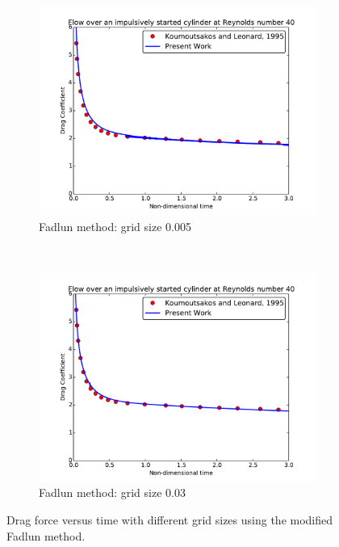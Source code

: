 \documentclass[onehalf,11pt]{beavtex}
\begin{document}
\begin{figure}[!htb]
	\centering
	\begin{subfigure}{0.4\textwidth}
		\includegraphics[width=\linewidth]{fadlun005}
		\caption{Fadlun method: grid size 0.005}
	\end{subfigure}
	~
	\begin{subfigure}{0.4\textwidth}
			\includegraphics[width=\linewidth]{fadlun03}
			\caption{Fadlun method: grid size 0.03}
	\end{subfigure}
	\caption{Drag force versus time with different grid sizes using the modified Fadlun method.}
	\label{fig:fadlun005}
\end{figure}
\end{document}
